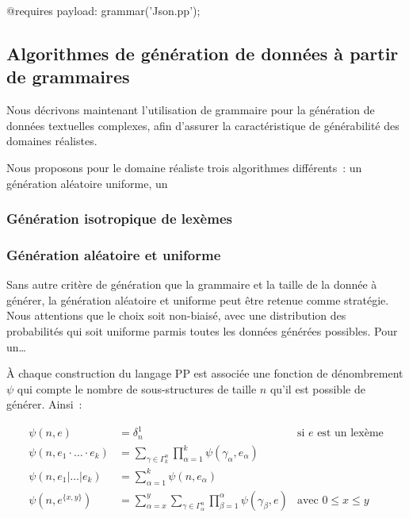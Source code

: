 \begin{pre}
@requires payload: grammar('Json.pp');
\end{pre}

\subsection{Algorithmes de génération de données à partir de grammaires}
\label{subsection:data:algorithms}

Nous décrivons maintenant l'utilisation de grammaire pour la génération de
données textuelles complexes, afin d'assurer la caractéristique de générabilité
des domaines réalistes.

Nous proposons pour le domaine réaliste  trois algorithmes
différents~: un génération aléatoire uniforme, un 

\subsubsection{Génération isotropique de lexèmes}
\label{subsection:data:isotropic_generation}

\subsubsection{Génération aléatoire et uniforme}
\label{subsection:data:random_uniform_generation}

Sans autre critère de génération que la grammaire et la taille de la donnée à
générer, la génération aléatoire et uniforme peut être retenue comme stratégie.
Nous attentions que le choix soit non-biaisé, avec une distribution des
probabilités qui soit uniforme parmis toutes les données générées possibles.
Pour un…

À chaque construction du langage PP est associée une fonction de dénombrement
$\psi$ qui compte le nombre de sous-structures de taille $n$ qu'il est possible
de générer. Ainsi~:

\begin{align*}
%
\psi(n, e) & =
    \delta_n^1
    &
    \text{si $e$ est un lexème}
    \\
%
\psi(n, e_1 \cdot \dotso \cdot e_k) & =
    \sum_{\gamma \in \Gamma_k^n}
    \prod_{\alpha = 1}^k
    \psi(\gamma_\alpha, e_\alpha)
    \\
%
\psi(n, e_1 \vert \dots \vert e_k) & =
    \sum_{\alpha = 1}^k
    \psi(n, e_\alpha)
    \\
%
\psi(n, e^{\{x, y\}}) & =
    \sum_{\alpha = x}^y
    \sum_{\gamma \in \Gamma_\alpha^n}
    \prod_{\beta = 1}^\alpha
    \psi(\gamma_\beta, e)
    &
    \text{avec $0 \leq x \leq y$}
%
\end{align*}

